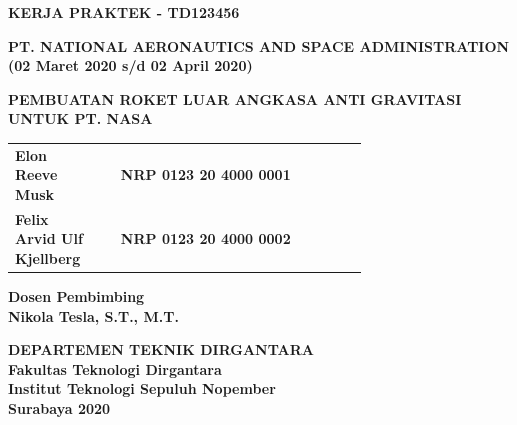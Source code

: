 \begin{flushleft}

  \sffamily

  \noindent
  \textbf{KERJA PRAKTEK - TD123456}
  \vspace{4ex}

  \noindent
  {\large \textbf{PT. NATIONAL AERONAUTICS AND SPACE ADMINISTRATION}} \\
  \textbf{(02 Maret 2020 s/d 02 April 2020)}
  \vspace{6ex}

  \noindent
  {\large \textbf{PEMBUATAN ROKET LUAR ANGKASA ANTI GRAVITASI UNTUK PT. NASA}}
  \vspace{6ex}

  \begin{adjustwidth}{-0.2cm}{}
    \begin{tabular}{lcp{0.7\linewidth}}
      \textbf{Elon Reeve Musk} & & \textbf{NRP 0123 20 4000 0001} \\
      \textbf{Felix Arvid Ulf Kjellberg} & & \textbf{NRP 0123 20 4000 0002} \\
    \end{tabular}
  \end{adjustwidth}
  \vspace{4ex}

  \noindent
  \textbf{Dosen Pembimbing} \\
  \textbf{Nikola Tesla, S.T., M.T.}
  \vspace{12ex}

  \noindent
  \textbf{DEPARTEMEN TEKNIK DIRGANTARA} \\
  \textbf{Fakultas Teknologi Dirgantara} \\
  \textbf{Institut Teknologi Sepuluh Nopember} \\
  \textbf{Surabaya 2020}

\end{flushleft}

\restoregeometry